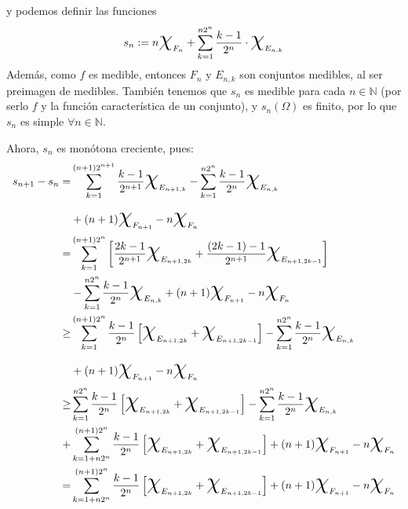 \documentclass[11pt, a4paper]{article}
\makeatletter
\newif\IfInSansMode
\let\oldsf\sffamily
\renewcommand*{\sffamily}{\oldsf\mathversion{sans}\InSansModetrue}
\let\oldnorm\normalfont
\renewcommand*{\normalfont}{\oldnorm\InSansModefalse\mathversion{normal}}
\renewenvironment{proof}[1][\proofname] {\par\pushQED{\qed}\normalfont\topsep6\p@\@plus6\p@\relax\trivlist\item[\hskip\labelsep\itshape\sffamily#1\@addpunct{.}]\ignorespaces}{\popQED\endtrivlist\@endpefalse}
\theoremstyle{theorem-style}
\theoremstyle{definition-style}
\theoremstyle{remark-style}
\theoremstyle{example-style}
\makeatother
\begin{document}
\begin{proof}
  y podemos definir las funciones
  \[
    s_n := n\text{\huge {$\chi$}}_{F_n} + \sum_{k=1}^{n2^n}\dfrac{k-1}{2^n}\cdot \text{\huge {$\chi$}}_{E_{n,k}}
  \]
  Además, como $f$ es medible, entonces $F_n$ y $E_{n,k}$ son conjuntos medibles, al ser preimagen de medibles. También tenemos que $s_n$ es medible para cada $n \in \mathbb{N}$ (por serlo $f$ y la función característica de un conjunto), y $s_n(\Omega)$ es finito, por lo que $s_n$ es simple $\forall n \in \mathbb{N}$.

  Ahora, ${s_n}$ es monótona creciente, pues:
      \begin{align*}
 s_{n+1}-s_n =&  \sum_{k=1}^{(n+1)2^{n+1}} \frac{k-1}{2^{n+1}} \text{\huge $\chi$}_{E_{n+1,k}} 
				- \sum_{k=1}^{n2^n} \frac{k-1}{2^n} \text{\huge $\chi$}_{E_{n,k}} 
				\\
			&+	(n+1) \text{\huge{$\chi$}}_{F_{n+1}} - n \text{\huge{$\chi$}}_{F_n} 
				\\ %
			=& \sum_{k=1}^{(n+1)2^{n}} \left[ \frac{2k-1}{2^{n+1}} \text{\huge $\chi$}_{E_{n+1,2k}} 
									+ \frac{(2k-1)-1}{2^{n+1}} \text{\huge $\chi$}_{E_{n+1,2k-1}}  \right]
									\\
			&
				- \sum_{k=1}^{n2^n} \frac{k-1}{2^n} \text{\huge $\chi$}_{E_{n,k}} 
				+	(n+1) \text{\huge{$\chi$}}_{F_{n+1}} - n \text{\huge{$\chi$}}_{F_n}
				\\
			\geq& \sum_{k=1}^{(n+1)2^{n}} \frac{k-1}{2^{n}} \left[  \text{\huge $\chi$}_{E_{n+1,2k}} 
									+ \text{\huge $\chi$}_{E_{n+1,2k-1}}  \right]
				- \sum_{k=1}^{n2^n} \frac{k-1}{2^n} \text{\huge $\chi$}_{E_{n,k}} 
				\\
				&+	(n+1) \text{\huge{$\chi$}}_{F_{n+1}} - n \text{\huge{$\chi$}}_{F_n}
				\\
				\geq& \sum_{k=1}^{n2^{n}} \frac{k-1}{2^{n}} \left[  \text{\huge $\chi$}_{E_{n+1,2k}} 
									+ \text{\huge $\chi$}_{E_{n+1,2k-1}}  \right]
				- \sum_{k=1}^{n2^n} \frac{k-1}{2^n} \text{\huge $\chi$}_{E_{n,k}} 
				\\
				+&\sum_{k=1+n 2^n}^{(n+1)2^{n}} \frac{k-1}{2^{n}} \left[  \text{\huge $\chi$}_{E_{n+1,2k}} 
									+ \text{\huge $\chi$}_{E_{n+1,2k-1}}  \right]
				+	(n+1) \text{\huge{$\chi$}}_{F_{n+1}} - n \text{\huge{$\chi$}}_{F_n}
                                \\
                                = & \sum_{k=1+n 2^n}^{(n+1)2^{n}} \frac{k-1}{2^{n}} \left[  \text{\huge $\chi$}_{E_{n+1,2k}} 
									+ \text{\huge $\chi$}_{E_{n+1,2k-1}}  \right]
				+	(n+1) \text{\huge{$\chi$}}_{F_{n+1}} - n \text{\huge{$\chi$}}_{F_n}
 \end{align*}


\end{proof}
\end{document}
